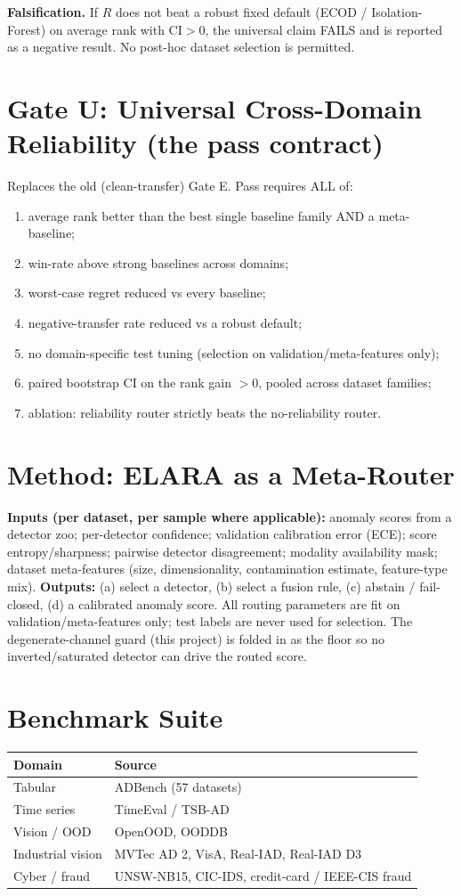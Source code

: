 \documentclass[11pt]{article}
\begin{document}
\noindent\textbf{Falsification.} If $R$ does not beat a robust fixed default
(ECOD / Isolation-Forest) on average rank with CI$>$0, the universal claim FAILS
and is reported as a negative result. No post-hoc dataset selection is permitted.

\section{Gate U: Universal Cross-Domain Reliability (the pass contract)}
Replaces the old (clean-transfer) Gate E. Pass requires ALL of:
\begin{enumerate}\itemsep0pt
\item average rank better than the best single baseline family AND a meta-baseline;
\item win-rate above strong baselines across domains;
\item worst-case regret reduced vs every baseline;
\item negative-transfer rate reduced vs a robust default;
\item no domain-specific test tuning (selection on validation/meta-features only);
\item paired bootstrap CI on the rank gain $>0$, pooled across dataset families;
\item ablation: reliability router strictly beats the no-reliability router.
\end{enumerate}

\section{Method: ELARA as a Meta-Router}
\textbf{Inputs (per dataset, per sample where applicable):} anomaly scores from a
detector zoo; per-detector confidence; validation calibration error (ECE); score
entropy/sharpness; pairwise detector disagreement; modality availability mask;
dataset meta-features (size, dimensionality, contamination estimate, feature-type
mix). \textbf{Outputs:} (a) select a detector, (b) select a fusion rule, (c)
abstain / fail-closed, (d) a calibrated anomaly score. All routing parameters are
fit on validation/meta-features only; test labels are never used for selection.
The degenerate-channel guard (this project) is folded in as the floor so no
inverted/saturated detector can drive the routed score.

\section{Benchmark Suite}
\begin{tabular}{ll}
\toprule
Domain & Source \\
\midrule
Tabular & ADBench (57 datasets) \\
Time series & TimeEval / TSB-AD \\
Vision / OOD & OpenOOD, OODDB \\
Industrial vision & MVTec AD 2, VisA, Real-IAD, Real-IAD D3 \\
Cyber / fraud & UNSW-NB15, CIC-IDS, credit-card / IEEE-CIS fraud \\
\bottomrule
\end{tabular}
\end{document}
